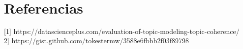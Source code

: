 \documentclass[11pt]{article}
\begin{document}
    \begin{center}
    \end{center}
    { \hspace*{\fill} \\}
    
    \section{Referencias}\label{referencias}

{[}1{]} https://datascienceplus.com/evaluation-of-topic-modeling-topic-coherence/ \\

\noindent {[}2{]} https://gist.github.com/tokestermw/3588e6fbbb2f03f89798


    
    
    
    
\end{document}
